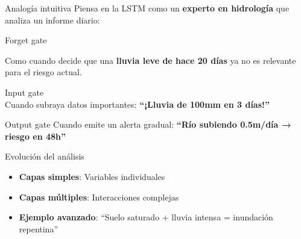 \documentclass[
  ignorenonframetext,
]{beamer}
\begin{document}
\begin{frame}{Analogía intuitiva}
\label{analoguxeda-intuitiva}
Piensa en la LSTM como un \textbf{experto en hidrología} que analiza un
informe diario:

Forget gate

Como cuando decide que una \textbf{lluvia leve de hace 20 días} ya no es
relevante para el riesgo actual.

Input gate\\
Cuando subraya datos importantes: \textbf{``¡Lluvia de 100mm en 3
días!''}

Output gate Cuando emite un alerta gradual: \textbf{``Río subiendo
0.5m/día → riesgo en 48h''}

Evolución del análisis

\begin{itemize}
\item
  \textbf{Capas simples}: Variables individuales
\item
  \textbf{Capas múltiples}: Interacciones complejas
\item
  \textbf{Ejemplo avanzado}: ``Suelo saturado + lluvia intensa =
  inundación repentina''
\end{itemize}
\end{frame}
\end{document}
